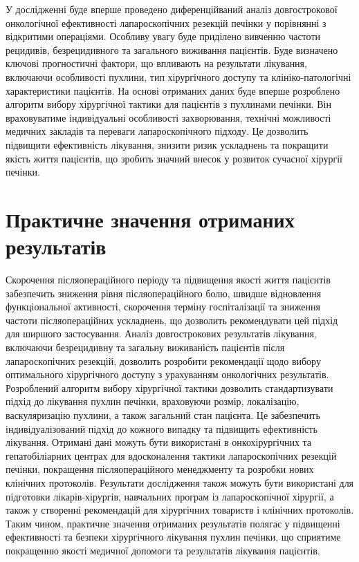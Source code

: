 У дослідженні буде вперше проведено диференційваний аналіз довгострокової онкологічної ефективності лапароскопічних резекцій печінки у порівнянні з відкритими операціями. Особливу увагу буде приділено вивченню частоти рецидивів, безрецидивного та загального виживання пацієнтів. Буде визначено ключові прогностичні фактори, що впливають на результати лікування, включаючи особливості пухлини, тип хірургічного доступу та клініко-патологічні характеристики пацієнтів.
На основі отриманих даних буде вперше розроблено алгоритм вибору хірургічної тактики для пацієнтів з пухлинами печінки. Він враховуватиме індивідуальні особливості захворювання, технічні можливості медичних закладів та переваги лапароскопічного підходу. Це дозволить підвищити ефективність лікування, знизити ризик ускладнень та покращити якість життя пацієнтів, що зробить значний внесок у розвиток сучасної хірургії печінки.


\section{Практичне значення отриманих результатів} 

Скорочення післяопераційного періоду та підвищення якості життя пацієнтів забезпечить зниження рівня післяопераційного болю, швидше відновлення функціональної активності, скорочення терміну госпіталізації та зниження частоти післяопераційних ускладнень, що дозволить рекомендувати цей підхід для ширшого застосування. Аналіз довгострокових результатів лікування, включаючи безрецидивну та загальну виживаність пацієнтів після лапароскопічних резекцій, дозволить розробити рекомендації щодо вибору оптимального хірургічного доступу з урахуванням онкологічних результатів.
Розроблений алгоритм вибору хірургічної тактики дозволить стандартизувати підхід до лікування пухлин печінки, враховуючи розмір, локалізацію, васкуляризацію пухлини, а також загальний стан пацієнта. Це забезпечить індивідуалізований підхід до кожного випадку та підвищить ефективність лікування. Отримані дані можуть бути використані в онкохірургічних та гепатобіліарних центрах для вдосконалення тактики лапароскопічних резекцій печінки, покращення післяопераційного менеджменту та розробки нових клінічних протоколів.
Результати дослідження також можуть бути використані для підготовки лікарів-хірургів, навчальних програм із лапароскопічної хірургії, а також у створенні рекомендацій для хірургічних товариств і клінічних протоколів. Таким чином, практичне значення отриманих результатів полягає у підвищенні ефективності та безпеки хірургічного лікування пухлин печінки, що сприятиме покращенню якості медичної допомоги та результатів лікування пацієнтів.


